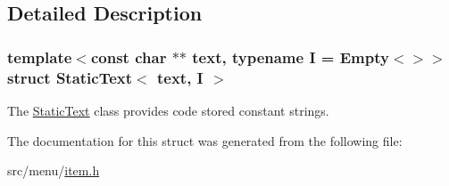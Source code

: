 \subsection{Detailed Description}
\subsubsection*{template$<$const char $\ast$$\ast$ text, typename I = Empty$<$$>$$>$\newline
struct Static\+Text$<$ text, I $>$}

The \hyperlink{structStaticText}{Static\+Text} class provides code stored constant strings. 

The documentation for this struct was generated from the following file\+:\begin{DoxyCompactItemize}
\item 
src/menu/\hyperlink{item_8h}{item.\+h}\end{DoxyCompactItemize}
